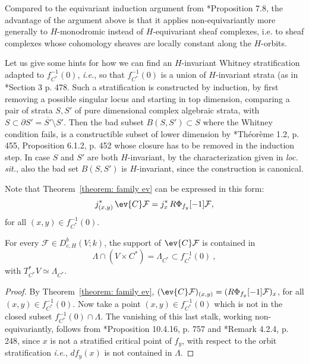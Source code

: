 \documentclass[11pt,letterpaper]{amsart}
\numberwithin{equation}{section}
\begin{document}
\begin{remark}
Compared to the equivariant induction argument from \cite{CFMMX22}*{Proposition 7.8},
the advantage of the argument above is that it applies non-equivariantly more generally to $H$-monodromic  instead of $H$-equivariant sheaf complexes, i.e. to sheaf complexes whose cohomology sheaves are locally constant along the  $H$-orbits.
\end{remark}


\begin{remark}\label{remark: bad}
    Let us give some hints for how we can find an $H$-invariant Whitney stratification adapted to $f_{C^*}^{-1}(0)$, {\it i.e.}, so that $f_{C^*}^{-1}(0)$ is a union of $H$-invariant strata (as in \cite{Tes82}*{Section 3 p. 478}.
    Such a stratification is constructed by induction, by first removing a possible singular locus and starting  in top dimension, comparing a pair of strata $S,S'$ of pure dimensional complex algebraic strata, with $S\subset \partial S' = \overline{S'}\setminus S'$.
    Then the bad subset $B(S,S')\subset S$ where the Whitney condition fails, is a constructible subset of lower dimension by \cite{Tes82}*{Théorème 1.2, p. 455, Proposition 6.1.2, p. 452}
    whose closure has to be removed in the induction step.
    In case $S$ and $S'$ are both $H$-invariant, by the characterization given in {\it loc. sit.}, also the bad set $B(S,S')$ is $H$-invariant, since the construction is canonical.
\end{remark}

Note that Theorem~\ref{theorem: family ev} can be expressed in this form:
\[
j_{(x,y)}^*\, \ev{C}\mathcal{F} = j_{x}^*\, R\Phi_{f_{y}}[-1]\mathcal{F},
\]
for all $(x,y)\in f_{C^*}^{-1}(0)$.


\begin{corollary}\label{corollary: conormal support}
    For every $\mathcal{F}\in D^b_{c,H}(V;k)$, the support of $\ev{C}\mathcal{F}$ is contained in 
    $$\Lambda \cap (V\times C^*) =\Lambda_{C^*} \subset f_{C^*}^{-1}(0)\:, $$
    with $T^*_{C^*}V \simeq \Lambda_{C^*}$.
\end{corollary}

\begin{proof}
    By Theorem~\ref{theorem: family ev}, $(\ev{C}\mathcal{F})_{(x,y)} = (R\Phi_{f_y}[-1]\mathcal{F})_x$, for all $(x,y)\in f_{C^*}^{-1}(0)$.
    Now take a point $(x,y)\in f_{C^*}^{-1}(0)$ which is not in the closed subset  $f_{C^*}^{-1}(0)\cap \Lambda$.
    The vanishing of this last stalk, working non-equivariantly, follows from \cite{MS22}*{Proposition 10.4.16, p. 757} and \cite{Sch03}*{Remark 4.2.4, p. 248}, since $x$ is not a stratified critical point of $f_y$, with respect to the orbit stratification {\it i.e.}, $df_y(x)$ is not contained in $\Lambda$.   
\end{proof}
\end{document}
